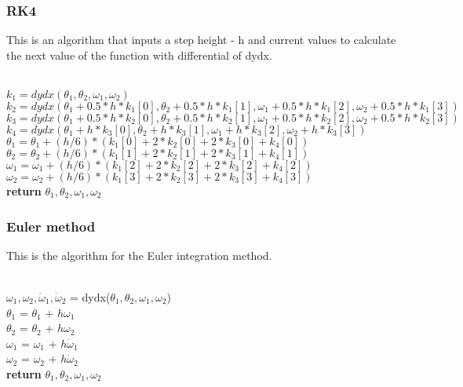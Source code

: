 \documentclass[12pt]{article}
\begin{document}
\subsubsection{RK4}
This is an algorithm that inputs a step height - h and current values to calculate the next value of the function with differential of dydx. \\
\begin{algorithmic}
\\
    \State $k_1 = dydx(\theta_1, \theta_2, \omega_1, \omega_2)$\\
    \State $k_2 = dydx(\theta_1 + 0.5*h*k_1[0], \theta_2 + 0.5*h*k_1[1], \omega_1 + 0.5*h*k_1[2], \omega_2 + 0.5*h*k_1[3]) $\\
    \State $k_3 = dydx(\theta_1 + 0.5*h*k_2[0], \theta_2 + 0.5*h*k_2[1], \omega_1 + 0.5*h*k_2[2], \omega_2 + 0.5*h*k_2[3]) $\\
    \State $k_4 = dydx(\theta_1 + h*k_3[0], \theta_2 + h*k_3[1], \omega_1 + h*k_3[2], \omega_2 + h*k_3[3]) $\\
    \State $\theta_1 = \theta_1 + (h/6) * (k_1[0] + 2*k_2[0] + 2*k_3[0] + k_4[0])$\\
    \State $\theta_2 = \theta_2 + (h/6) * (k_1[1] + 2*k_2[1] + 2*k_3[1] + k_4[1])$\\
    \State $\omega_1 = \omega_1 + (h/6) * (k_1[2] + 2*k_2[2] + 2*k_3[2] + k_4[2])$\\
    \State $\omega_2 = \omega_2 + (h/6) * (k_1[3] + 2*k_2[3] + 2*k_3[3] + k_4[3])$\\
    \State \textbf{return} $\theta_1, \theta_2, \omega_1, \omega_2$\\
\EndProcedure
\end{algorithmic}

\subsubsection{Euler method}

This is the algorithm for the Euler integration method.

\begin{algorithmic}
\\
    \State $\omega_1, \omega_2, \dot\omega_1, \dot\omega_2$ = dydx($\theta_1, \theta_2, \omega_1, \omega_2$)\\
    \State $\theta_1$ = $\theta_1$ + $h\omega_1$\\
    \State $\theta_2$ = $\theta_2$ + $h\omega_2$\\
    \State $\omega_1$ = $\omega_1$ + $h\dot\omega_1$\\
    \State $\omega_2$ = $\omega_2$ + $h\dot\omega_2$\\
    \State \textbf{return} $\theta_1, \theta_2, \omega_1, \omega_2$\\
\EndProcedure
\end{algorithmic}
\end{document}
